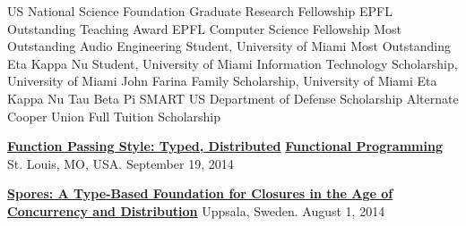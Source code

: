 \documentclass[9pt]{article}
\begin{document}
\noindent US National Science Foundation Graduate Research Fellowship 
\newline\noindent EPFL Outstanding Teaching Award 
\newline\noindent EPFL Computer Science Fellowship 
\newline\noindent Most Outstanding Audio Engineering Student, University of Miami 
\newline\noindent Most Outstanding Eta Kappa Nu Student, University of Miami 
\newline\noindent Information Technology Scholarship, University of Miami 
\newline\noindent John Farina Family Scholarship, University of Miami 
\newline\noindent Eta Kappa Nu 
\newline\noindent Tau Beta Pi 
\newline\noindent SMART US Department of Defense Scholarship Alternate 
\newline\noindent Cooper Union Full Tuition Scholarship 

\bigskip

\pagebreak
\medskip
{}

\vspace{-0.02in}
\noindent\href{https://speakerdeck.com/heathermiller/function-passing-style-typed-distributed-functional-programming}{\bf Function Passing Style: Typed, Distributed} \vspace{-0.03in}
\linebreak\noindent\href{https://speakerdeck.com/heathermiller/function-passing-style-typed-distributed-functional-programming}{\bf Functional Programming}\dates{}
\linebreak\noindent St. Louis, MO, USA. September 19, 2014
\bigskip


\noindent\href{https://speakerdeck.com/heathermiller/spores-a-type-based-foundation-for-closures-in-the-age-of-concurrency-and-distribution}{\bf Spores: A Type-Based Foundation for Closures in the Age of} \vspace{-0.03in}
\linebreak\noindent\href{https://speakerdeck.com/heathermiller/spores-a-type-based-foundation-for-closures-in-the-age-of-concurrency-and-distribution}{\bf Concurrency and Distribution}\dates{}
\linebreak\noindent Uppsala, Sweden. August 1, 2014
\bigskip
\end{document}
